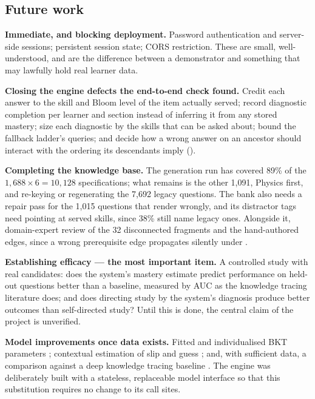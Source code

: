 \subsection{Future work}
\label{sec:future}

\textbf{Immediate, and blocking deployment.} Password authentication and
server-side sessions; persistent session state; CORS restriction. These are
small, well-understood, and are the difference between a demonstrator and
something that may lawfully hold real learner data.

\textbf{Closing the engine defects the end-to-end check found.} Credit each
answer to the skill and Bloom level of the item actually served; record
diagnostic completion per learner and section instead of inferring it from any
stored mastery; size each diagnostic by the skills that can be asked about;
bound the fallback ladder's queries; and decide how a wrong answer on an
ancestor should interact with the ordering its descendants imply
().

\textbf{Completing the knowledge base.} The generation run has covered 89\% of
the $1{,}688 \times 6 = 10{,}128$ specifications; what remains is the other 1{,}091,
Physics first, and re-keying or regenerating the 7{,}692 legacy questions. The
bank also needs a repair pass for the 1{,}015 questions that render wrongly, and
its distractor tags need pointing at served skills, since 38\% still name legacy
ones. Alongside it, domain-expert review of the 32 disconnected fragments and the
hand-authored edges, since a wrong prerequisite edge propagates silently under
.

\textbf{Establishing efficacy --- the most important item.} A controlled study
with real candidates: does the system's mastery estimate predict performance on
held-out questions better than a baseline, measured by AUC as the knowledge
tracing literature does; and does directing study by the system's diagnosis
produce better outcomes than self-directed study? Until this is done, the central
claim of the project is unverified.

\textbf{Model improvements once data exists.} Fitted and individualised BKT
parameters \cite{yudelson2013individualized}; contextual estimation of slip and
guess \cite{baker2008more}; and, with sufficient data, a comparison against a
deep knowledge tracing baseline \cite{piech2015deep}. The engine was
deliberately built with a stateless, replaceable model interface so that this
substitution requires no change to its call sites.

